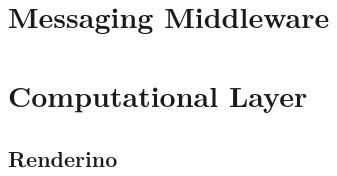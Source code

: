 \documentclass{Configuration_Files/PoliMi3i_thesis}
\begin{document}
		\section{Messaging Middleware}
		\label{se:mom}

		\section{Computational Layer}
		\label{se:complayer}
			
			\subsection{Renderino}
			\label{sse:renderino}

\end{document}
